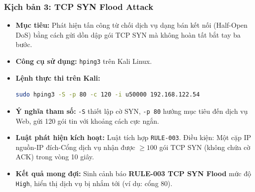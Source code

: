 \subsubsection{Kịch bản 3: TCP SYN Flood Attack}
\begin{itemize}
    \item \textbf{Mục tiêu:} Phát hiện tấn công từ chối dịch vụ dạng bán kết nối (Half-Open DoS) bằng cách gửi dồn dập gói TCP SYN mà không hoàn tất bắt tay ba bước.
    \item \textbf{Công cụ sử dụng:} \texttt{hping3} trên Kali Linux.
    \item \textbf{Lệnh thực thi trên Kali:}
    \begin{lstlisting}[language=bash]
sudo hping3 -S -p 80 -c 120 -i u50000 192.168.122.54
    \end{lstlisting}
    \item \textbf{Ý nghĩa tham số:} \texttt{-S} thiết lập cờ SYN, \texttt{-p 80} hướng mục tiêu đến dịch vụ Web, gửi 120 gói tin với khoảng cách cực ngắn.
    \item \textbf{Luật phát hiện kích hoạt:} Luật tích hợp \texttt{RULE-003}. Điều kiện: Một cặp IP nguồn-IP đích-Cổng dịch vụ nhận được $\ge 100$ gói TCP SYN (không chứa cờ ACK) trong vòng 10 giây.
    \item \textbf{Kết quả mong đợi:} Sinh cảnh báo \textbf{RULE-003 TCP SYN Flood} mức độ \texttt{High}, hiển thị dịch vụ bị nhắm tới (ví dụ: cổng 80).
\end{itemize}

